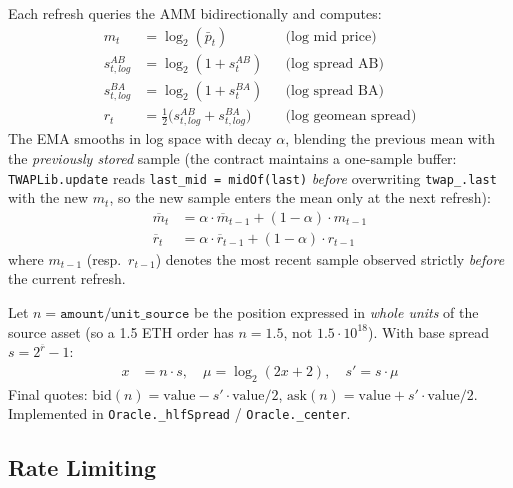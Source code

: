 \documentclass[10pt,a4paper,twocolumn]{article}
\begin{document}
\begin{definition}
\label{def:twap-quote}
Each refresh queries the AMM bidirectionally and computes:
\begin{align}
m_t &= \log_2(\bar{p}_t) && \text{(log mid price)} \\
s^{AB}_{t,log} &= \log_2(1 + s^{AB}_t) && \text{(log spread AB)} \\
s^{BA}_{t,log} &= \log_2(1 + s^{BA}_t) && \text{(log spread BA)} \\
r_t &= \tfrac{1}{2}\bigl(s^{AB}_{t,log} + s^{BA}_{t,log}\bigr) && \text{(log geomean spread)}
\end{align}
The EMA smooths in log space with decay $\alpha$, blending the previous mean with the \emph{previously stored} sample (the contract maintains a one-sample buffer: \texttt{TWAPLib.update} reads \texttt{last\_mid = midOf(last)} \emph{before} overwriting \texttt{twap\_.last} with the new $m_t$, so the new sample enters the mean only at the next refresh):
\begin{align}
\overline{m}_t &= \alpha \cdot \overline{m}_{t-1} + (1{-}\alpha) \cdot m_{t-1} \\
\overline{r}_t &= \alpha \cdot \overline{r}_{t-1} + (1{-}\alpha) \cdot r_{t-1}
\end{align}
where $m_{t-1}$ (resp.\ $r_{t-1}$) denotes the most recent sample observed strictly \emph{before} the current refresh.
\end{definition}

\begin{definition}
\label{def:spread-scaling}
Let $n = \texttt{amount}/\texttt{unit\_source}$ be the position expressed in \emph{whole units} of the source asset (so a 1.5 ETH order has $n = 1.5$, not $1.5 \cdot 10^{18}$). With base spread $s = 2^{\overline{r}} - 1$:
\begin{align}
x &= n \cdot s, \quad \mu = \log_2(2x + 2), \quad s' = s \cdot \mu
\end{align}
Final quotes: $\text{bid}(n) = \text{value} - s' \cdot \text{value}/2$, $\text{ask}(n) = \text{value} + s' \cdot \text{value}/2$. Implemented in \texttt{Oracle.\_hlfSpread} / \texttt{Oracle.\_center}.
\end{definition}

\subsection{Rate Limiting}
\end{document}
